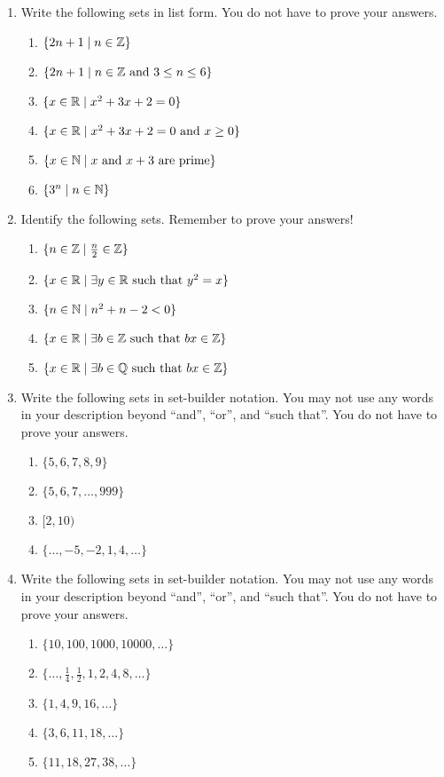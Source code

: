 \probsec{~\ref{sec:what-set}}
\begin{enumerate}
    \item Write the following sets in list form. You do not have to prove your answers.
  \begin{enumerate}
      \item $\{2n + 1 \mid n \in \mathbb{Z}\}$
      \item $\{2n + 1 \mid n \in \mathbb{Z} \text{ and } 3 \leq n \leq 6\}$
      \item $\{x \in \mathbb{R} \mid x^2 + 3x + 2 = 0\}$
      \item $\{x \in \mathbb{R} \mid x^2 + 3x + 2 = 0 \text{ and } x \geq 0\}$
      \item $\{x \in \mathbb{N} \mid x \text{ and } x+3 \text{ are prime}\}$
      \item $\{3^n \mid n \in \mathbb{N}\}$
  \end{enumerate}

    \item Identify the following sets. Remember to prove your answers!
  \begin{enumerate}
      \item $\{n \in \mathbb{Z} \mid \frac{n}{2} \in \mathbb{Z}\}$
      \item $\{x \in \mathbb{R} \mid \exists y \in \mathbb{R} \text{ such that } y^2 = x\}$
      \item $\{n \in \mathbb{N} \mid n^2 + n - 2 < 0\}$
      \item $\{x \in \mathbb{R} \mid \exists b \in \mathbb{Z} \text{ such that } bx \in \mathbb{Z}\}$
      \item $\{x \in \mathbb{R} \mid \exists b \in \mathbb{Q} \text{ such that } bx \in \mathbb{Z}\}$
  \end{enumerate}

    \item Write the following sets in set-builder notation. You may not use any words in your description beyond ``and'', ``or'', and ``such that''. You do not have to prove your answers.
  \begin{enumerate}
      \item $\{5, 6, 7, 8, 9\}$
      \item $\{5, 6, 7, \dots, 999\}$
      \item $[2, 10)$
      \item $\{\dots, -5, -2, 1, 4, \dots\}$
  \end{enumerate}

    \item Write the following sets in set-builder notation. You may not use any words in your description beyond ``and'', ``or'', and ``such that''. You do not have to prove your answers.
  \begin{enumerate}
      \item $\{10, 100, 1000, 10000, \dots\}$
      \item $\{\dots, \frac14, \frac12, 1, 2, 4, 8, \dots\}$
      \item $\{1, 4, 9, 16, \dots\}$
      \item $\{3, 6, 11, 18, \dots\}$
      \item $\{11, 18, 27, 38, \dots\}$
  \end{enumerate}


\end{enumerate}

